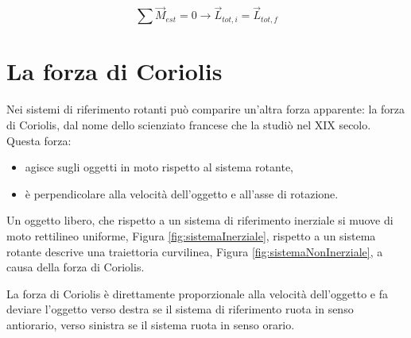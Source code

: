 \begin{equation}
    \sum \vec{M}_{est}  = 0 \rightarrow \vec{L}_{tot,i} = \vec{L}_{tot,f}
\end{equation}

\section{La forza di Coriolis}
Nei sistemi di riferimento rotanti può comparire un’altra forza apparente: la forza di Coriolis, dal nome dello scienziato francese che la studiò nel XIX secolo. 
Questa forza:

\begin{itemize}
    \item agisce sugli oggetti in moto rispetto al sistema rotante,
    \item è perpendicolare alla velocità dell’oggetto e all’asse di rotazione.
\end{itemize}

Un oggetto libero, che rispetto a un sistema di riferimento inerziale si muove di moto rettilineo uniforme, Figura \ref{fig:sistemaInerziale}, rispetto a un sistema rotante descrive una traiettoria curvilinea, Figura \ref{fig:sistemaNonInerziale}, a causa della forza di Coriolis.

La forza di Coriolis è direttamente proporzionale alla velocità dell’oggetto e fa deviare
l'oggetto verso destra se il sistema di riferimento ruota in senso antiorario, verso sinistra se il sistema ruota in senso orario.

